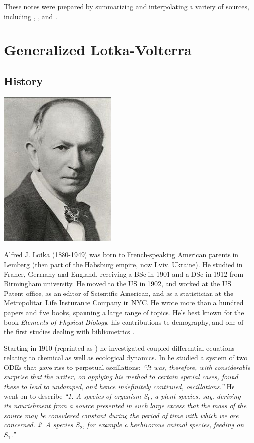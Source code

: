 \documentclass[
]{book}
\begin{document}
These notes were prepared by summarizing and interpolating a variety of sources, including \citet{hadeler2017topics}, \citet{hofbauer1998evolutionary}, and \citet{baigent2016lotka}.

\hypertarget{intro}{%
\chapter{Generalized Lotka-Volterra}\label{intro}}

\hypertarget{history}{%
\section{History}\label{history}}

\begin{center}\includegraphics[width=0.25\linewidth]{images/Lotka} \end{center}

Alfred J. Lotka (1880-1949) was born to French-speaking American parents in Lemberg (then part of the Habsburg empire, now Lviv, Ukraine). He studied in France, Germany and England, receiving a BSc in 1901 and a DSc in 1912 from Birmingham university. He moved to the US in 1902, and worked at the US Patent office, as an editor of Scientific American, and as a statistician at the Metropolitan Life Insturance Company in NYC. He wrote more than a hundred papers and five books, spanning a large range of topics. He's best known for the book \emph{Elements of Physical Biology}, his contributions to demography, and one of the first studies dealing with bibliometrics \citep{lotka1926frequency}.

Starting in 1910 (reprinted as \citet{lotka2002contribution}) he investigated coupled differential equations relating to chemical as well as ecological dynamics. In \citet{lotka1920analytical} he studied a system of two ODEs that gave rise to perpetual oscillations: \emph{``It was, therefore, with considerable surprise that the writer, on applying his method to certain special cases, found these to lead to undamped, and hence indefinitely continued, oscillations.''} He went on to describe \emph{``1. A species of organism \(S_1\), a plant species, say, deriving its nourishment from a source presented in such large excess that the mass of the source may be considered constant during the period of time with which we are concerned. 2. A species \(S_2\), for example a herbivorous animal species, feeding on \(S_1\).''}
\end{document}
